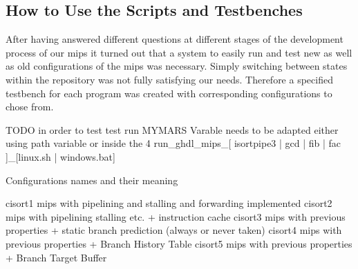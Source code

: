 
\subsection{How to Use the Scripts and Testbenches}
\label{sec:howToUseScripts}

After having answered different questions at different stages of the development process of our mips it turned out that a system to easily run and test new as well as old configurations of the mips was necessary. Simply switching between states within the repository was not fully satisfying our needs. Therefore a specified testbench for each program was created with corresponding configurations to chose from.



TODO in order to test test run MYMARS Varable needs to be adapted either using path variable or inside the 4 run_ghdl_mips_[ isortpipe3 | gcd | fib | fac ]_[linux.sh | windows.bat]

Configurations names and their meaning

cisort1 mips with pipelining and stalling and forwarding implemented
cisort2 mips with pipelining stalling etc. + instruction cache
cisort3 mips with previous properties + static branch prediction (always or never taken)
cisort4 mips with previous properties + Branch History Table
cisort5 mips with previous properties + Branch Target Buffer

\begin{table}[h]
\end{table}





